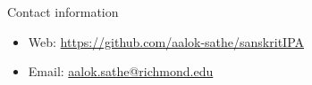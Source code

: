 \documentclass[final]{beamer}
\newlength{\sepwid}
\newlength{\onecolwid}
\begin{document}
\begin{frame}[t]
\begin{columns}[t]
\begin{column}{\onecolwid}
                \begin{alertblock}{Contact information}

                    \begin{itemize}
                        \item Web: \href{https://github.com/aalok-sathe/sanskrit_IPA}{https://github.com/aalok-sathe/sanskrit\textunderscore IPA}
                        \item Email: \href{mailto:aalok.sathe@richmond.edu}{aalok.sathe@richmond.edu}
                    \end{itemize}

                \end{alertblock}



            \end{column} %

            \begin{column}{\sepwid}\end{column}         %
            

        \end{columns}       %
        
        

\end{frame} %
\end{document}
